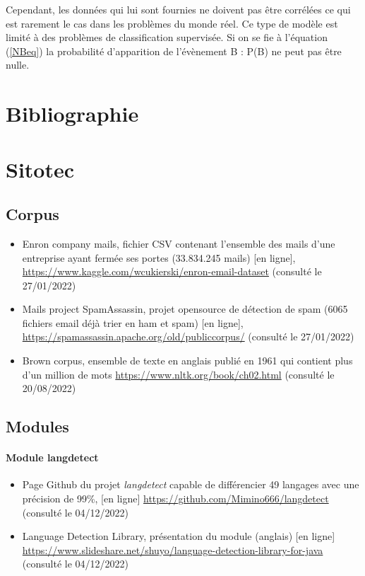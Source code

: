 \documentclass[a4paper,12pt]{article}
\begin{document}
				Cependant, les données qui lui sont fournies ne doivent pas être corrélées ce qui est rarement le cas dans les problèmes du monde réel. Ce type de modèle est limité à des problèmes de classification supervisée. Si on se fie à l'équation (\ref{NBeq}) la probabilité d'apparition de l’évènement B : P(B) ne peut pas être nulle. 
				
										
	\section{Bibliographie}
		
		
		


		
	\section{Sitotec}
		\subsection{Corpus}
			\begin{itemize}
				\item Enron company mails, fichier CSV contenant l'ensemble des mails d'une entreprise ayant fermée ses portes (33.834.245 mails) [en ligne], \url{https://www.kaggle.com/wcukierski/enron-email-dataset} (consulté le 27/01/2022) \label{Enron_dataset}
				\item Mails project SpamAssassin, projet opensource de détection de spam (6065 fichiers email déjà trier en ham et spam) [en ligne], \url{https://spamassassin.apache.org/old/publiccorpus/} (consulté le 27/01/2022) \label{SpamAssassin_dataset}
				\item Brown corpus, ensemble de texte en anglais publié en 1961 qui contient plus d'un million de mots \url{https://www.nltk.org/book/ch02.html} (consulté le 20/08/2022) \label{Brown_corpus}
			\end{itemize}
		
		\subsection{Modules}
			\paragraph{Module langdetect}
			\begin{itemize}
				\item Page Github du projet \emph{langdetect} capable de différencier 49 langages avec une précision de 99\%, [en ligne] \url{https://github.com/Mimino666/langdetect} (consulté le 04/12/2022) \label{langdetect}
				\item Language Detection Library, présentation du module (anglais) [en ligne] \url{https://www.slideshare.net/shuyo/language-detection-library-for-java} (consulté le 04/12/2022)
			\end{itemize}
			
\end{document}
